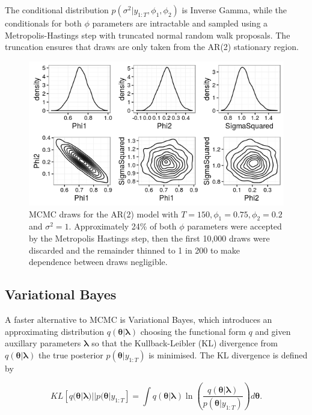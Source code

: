 \documentclass[12pt,a4paper]{article}%
\numberwithin{equation}{section}
\begin{document}
The conditional distribution $p(\sigma^2 | y_{1:T}, \phi_1, \phi_2)$ is Inverse Gamma, while the conditionals for both $\phi$ parameters are intractable and sampled using a Metropolis-Hastings step with truncated normal random walk proposals. The truncation ensures that draws are only taken from the AR(2) stationary region.

\begin{figure}[h]
\centering
\includegraphics[width=0.7\linewidth,height=\textheight,keepaspectratio]{MCMC.png}
\caption{MCMC draws for the AR(2) model with $T = 150, \phi_1 = 0.75, \phi_2 = 0.2$ and $\sigma^2 = 1$. Approximately 24\% of both $\phi$ parameters were accepted by the Metropolis Hastings step, then the first 10,000 draws were discarded and the remainder thinned to 1 in 200 to make dependence between draws negligible.}
\label{MCMCplot}
\end{figure}

\subsection{Variational Bayes}

A faster alternative to MCMC is Variational Bayes, which introduces an approximating distribution $q(\boldsymbol{\theta} | \boldsymbol{\lambda})$ choosing the functional form $q$ and given auxillary parameters $\boldsymbol{\lambda}$ so that the Kullback-Leibler (KL) divergence \citep{Kullback1951} from $q(\boldsymbol{\theta} | \boldsymbol{\lambda})$ the true posterior $p(\boldsymbol{\theta} | y_{1:T})$ is minimised. The KL divergence is defined by

\begin{equation}
\label{KL-def}
KL[q(\boldsymbol{\theta} | \boldsymbol{\lambda})||p(\boldsymbol{\theta} | y_{1:T}] = \int q(\boldsymbol{\theta} | \boldsymbol{\lambda}) \ln \left( \frac{q(\boldsymbol{\theta} | \boldsymbol{\lambda})}{p(\boldsymbol{\theta} |y_{1:T})}\right) d\boldsymbol{\theta}.
\end{equation}
\end{document}
